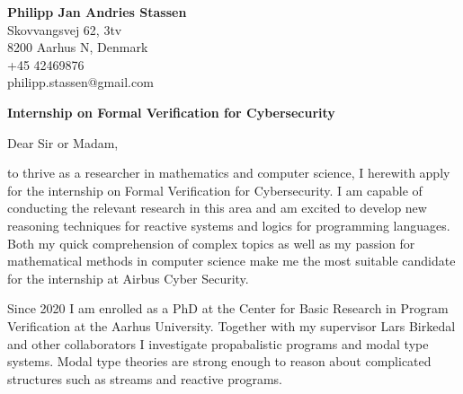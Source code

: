 \documentclass[10pt]{letter} %
\begin{document}
\begin{letter}{}%
\begin{center}
	\textbf{Philipp Jan Andries Stassen} \\ %
Skovvangsvej 62, 3tv\\ 8200 Aarhus N, Denmark\\ +45 42469876 \\ philipp.stassen@gmail.com %
\end{center} 

\vspace{1.5em}
\begin{center} \large\bf Internship on Formal Verification for Cybersecurity
\end{center}
\bigskip


Dear Sir or Madam,

\smallskip

to thrive as a researcher in mathematics and computer science, I herewith apply for the internship on Formal Verification for Cybersecurity.
I am capable of conducting the relevant research in this area and am excited to develop new reasoning techniques for reactive systems and logics for programming languages.
Both my quick comprehension of complex topics as well as my passion for mathematical methods in computer science make me the most suitable candidate for the internship at Airbus Cyber Security.

Since 2020 I am enrolled as a PhD at the Center for Basic Research in Program Verification at the Aarhus University.
Together with my supervisor Lars Birkedal and other collaborators I investigate propabalistic programs and modal type systems.
Modal type theories are strong enough to reason about complicated structures such as streams and reactive programs.


\end{letter}
\end{document}
